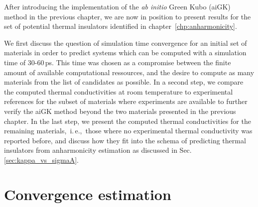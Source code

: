 \label{chp:results}

After introducing the implementation of the \emph{ab initio} Green Kubo (aiGK) method in the previous chapter, we are now in position to present results for the set of potential thermal insulators identified in chapter~\ref{chp:anharmonicity}.

We first discuss the question of simulation time convergence for an initial set of materials in order to predict systems which can be computed with a simulation time of 30-60\,ps. This time was chosen as a compromise between the finite amount of available computational ressources, and the desire to compute as many materials from the list of candidates as possible.
%
In a second step, we compare the computed thermal conductivities at room temperature to experimental references for the subset of materials where experiments are available to further verify the aiGK method beyond the two materials presented in the previous chapter.
%
In the last step, we present the computed thermal conductivities for the remaining materials,~i.\,e.,~those where no experimental thermal conductivity was reported before, and discuss how they fit into the schema of predicting thermal insulators from anharmonicity estimation as discussed in Sec.\,\ref{sec:kappa_vs_sigmaA}.




\section{Convergence estimation}

